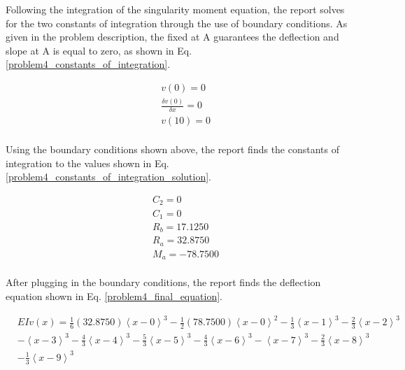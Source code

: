 \documentclass[a4paper]{article}
\begin{document}
Following the integration of the singularity moment equation, the report solves for the two constants of integration through the use of boundary conditions. As given in the problem description, the fixed at A guarantees the deflection and slope at A is equal to zero, as shown in Eq. \ref{problem4_constants_of_integration}.

\begin{equation}
\begin{split}
	& v(0) = 0 \\
	& \frac{\delta v(0)}{\delta x} = 0 \\
	& v(10) = 0 \\
\end{split}
\label{problem4_constants_of_integration}
\end{equation}

Using the boundary conditions shown above, the report finds the constants of integration to the values shown in Eq. \ref{problem4_constants_of_integration_solution}.

\begin{equation}
\begin{split}
	& C_2 = 0 \\
	& C_1 = 0 \\
	& R_b = 17.1250\\
	& R_a = 32.8750\\
	& M_a = -78.7500\\
\end{split}
\label{problem4_constants_of_integration_solution}
\end{equation}

After plugging in the boundary conditions, the report finds the deflection equation shown in Eq. \ref{problem4_final_equation}.

\begin{equation}
\begin{split}
& EI v(x) = \frac{1}{6}\left(32.8750\right)\left<x-0\right>^3 - \frac{1}{2}\left(78.7500\right)\left<x-0\right>^2 - \frac{1}{3}\left<x-1\right>^3 - \frac{2}{3}\left<x-2\right>^3 \\
& - \left<x-3\right>^3 - \frac{4}{3}\left<x-4\right>^3 - \frac{5}{3}\left<x-5\right>^3  -  \frac{4}{3}\left<x-6\right>^3 - \left<x-7\right>^3 -  \frac{2}{3}\left<x-8\right>^3  \\
& - \frac{1}{3}\left<x-9\right>^3 \\
\end{split}
\label{problem4_final_equation}
\end{equation}
\end{document}
